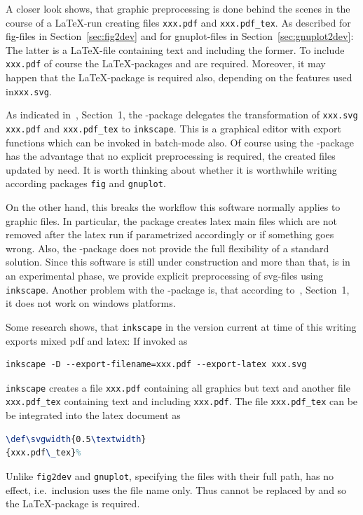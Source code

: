 \documentclass[12pt]{book}
\begin{document}
A closer look shows, that graphic preprocessing is done behind the scenes 
in the course of a \LaTeX-run 
creating files \texttt{xxx.pdf} and \texttt{xxx.pdf\_tex}. 
As described for fig-files in Section~\ref{sec:fig2dev} 
and for gnuplot-files in Section~\ref{sec:gnuplot2dev}: 
The latter is a \LaTeX-file containing text 
and including the former. 
To include \texttt{xxx.pdf} 
of course the \LaTeX-packages  and  
are required. 
Moreover, it may happen that the \LaTeX-package  
is required also, depending on the features used in\texttt{xxx.svg}. 

As indicated in~\cite{SvgP}, Section~1, 
the -package delegates the transformation 
of \texttt{xxx.svg} \texttt{xxx.pdf} and \texttt{xxx.pdf\_tex} 
to \texttt{inkscape}. 
This is a graphical editor with export functions 
which can be invoked in batch-mode also. 
Of course using the -package has the advantage 
that no explicit preprocessing is required, 
the created files updated by need. 
It is worth thinking about whether it is worthwhile 
writing according packages \texttt{fig} and \texttt{gnuplot}. 

On the other hand, 
this breaks the workflow this software normally applies to graphic files. 
In particular, the package creates latex main files 
which are not removed after the latex run 
if parametrized accordingly or if something goes wrong. 
Also, the -package does not provide the full flexibility 
of a standard solution. 
Since this software is still under construction 
and more than that, is in an experimental phase, 
we provide explicit preprocessing of svg-files using \texttt{inkscape}. 
Another problem with the -package is, 
that according to~\cite{SvgP}, Section~1, 
it does not work on windows platforms. 


Some research shows,
that \texttt{inkscape} in the version current at time of this writing
exports mixed pdf and latex: If invoked as 
%
\begin{Verbatim}[fontsize=\normalsize]
inkscape -D --export-filename=xxx.pdf --export-latex xxx.svg 
\end{Verbatim}
%
\texttt{inkscape} creates a file \texttt{xxx.pdf}
containing all graphics but text and another file \texttt{xxx.pdf\_tex}
containing text and including \texttt{xxx.pdf}.
The file \texttt{xxx.pdf\_tex}
can be be integrated into the latex document as
%
\begin{lstlisting}[language=TeX]
\def\svgwidth{0.5\textwidth}
{xxx.pdf\_tex}%
\end{lstlisting}
%
Unlike \texttt{fig2dev} and \texttt{gnuplot}, 
specifying the files with their full path, 
has no effect, i.e.~inclusion uses the file name only. 
Thus  cannot be replaced by  
and so the \LaTeX-package  is required. 
 
\end{document}
